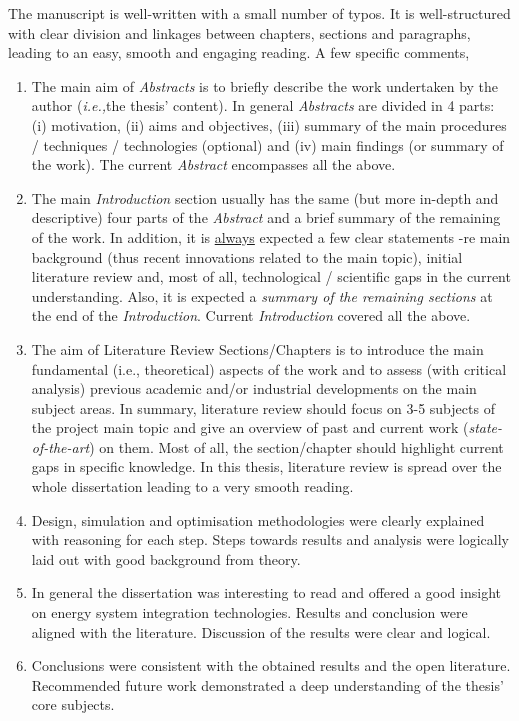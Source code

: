 \documentclass[14pt,twoside]{report}
\newcommand{\ie}{{\it i.e.,}}
\begin{document}
The manuscript is well-written with a small number of typos. It is well-structured with clear division and linkages between chapters, sections and paragraphs, leading to an easy, smooth and engaging reading. A few specific comments,
\begin{enumerate}
%
\item The main aim of {\it Abstracts} is to briefly describe the work undertaken by the author (\ie the thesis' content). In general {\it Abstracts} are divided in 4 parts: (i) motivation, (ii) aims and objectives, (iii) summary of the main procedures / techniques / technologies (optional) and (iv) main findings (or summary of the work). The current {\it Abstract} encompasses all the above.
%
\item The main {\it Introduction} section usually has the same (but more in-depth and descriptive) four parts of the {\it Abstract} and a brief summary of the remaining of the work. In addition, it is \underline{always} expected a few clear statements -re main background (thus recent innovations related to the main topic), initial literature review and, most of all, technological / scientific gaps in the current understanding. Also, it is expected a {\it summary of the remaining sections} at the end of the {\it Introduction}.  Current {\it Introduction} covered all the above.
%
\item The aim of Literature Review Sections/Chapters is to introduce the main fundamental (i.e., theoretical) aspects of the work and to assess (with critical analysis) previous academic and/or industrial developments on the main subject areas. In summary, literature review should focus on 3-5 subjects of the project main topic and give an overview of past and current work ({\it state-of-the-art}) on them. Most of all, the section/chapter should highlight current gaps in specific knowledge. In this thesis, literature review is spread over the whole dissertation leading to a very smooth reading.
%
\item Design, simulation and optimisation methodologies were clearly explained with reasoning for each step. Steps towards results and analysis were logically laid out with good background from theory.
%
\item In general the dissertation was interesting to read and offered a good insight on energy system integration technologies. Results and conclusion were aligned with the literature. Discussion of the results were clear and logical. 
%
\item Conclusions were consistent with the obtained results and the open literature. Recommended future work demonstrated a deep understanding of the thesis' core subjects.
%
\end{enumerate}
\end{document}
